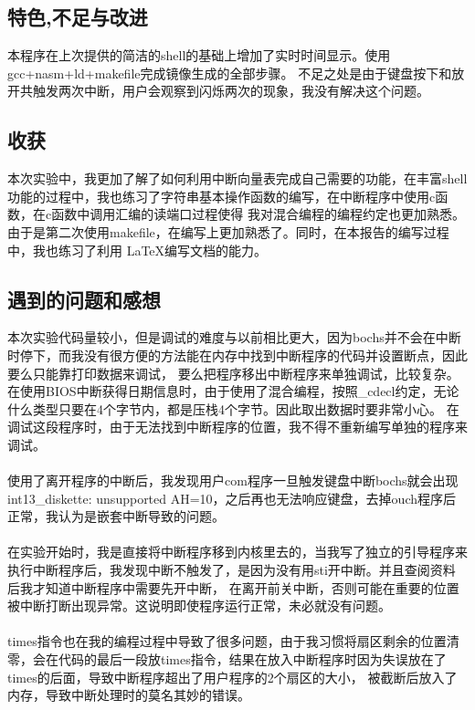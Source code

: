\documentclass[a4paper, 11pt]{article} %
\begin{document}


\subsection{特色,不足与改进}

本程序在上次提供的简洁的shell的基础上增加了实时时间显示。使用gcc+nasm+ld+makefile完成镜像生成的全部步骤。
不足之处是由于键盘按下和放开共触发两次中断，用户会观察到闪烁两次的现象，我没有解决这个问题。

\subsection{收获}

本次实验中，我更加了解了如何利用中断向量表完成自己需要的功能，在丰富shell功能的过程中，我也练习了字符串基本操作函数的编写，在中断程序中使用c函数，在c函数中调用汇编的读端口过程使得
我对混合编程的编程约定也更加熟悉。由于是第二次使用makefile，在编写上更加熟悉了\cite{makefile}。同时，在本报告的编写过程中，我也练习了利用 \LaTeX 编写文档的能力。\cite{lamport94, cite}

\subsection{遇到的问题和感想}
本次实验代码量较小，但是调试的难度与以前相比更大，因为bochs并不会在中断时停下，而我没有很方便的方法能在内存中找到中断程序的代码并设置断点，因此要么只能靠打印数据来调试，
要么把程序移出中断程序来单独调试，比较复杂。在使用BIOS中断获得日期信息时，由于使用了混合编程，按照\_cdecl约定，无论什么类型只要在4个字节内，都是压栈4个字节。因此取出数据时要非常小心。
在调试这段程序时，由于无法找到中断程序的位置，我不得不重新编写单独的程序来调试。
\paragraph{}
使用了离开程序的中断后，我发现用户com程序一旦触发键盘中断bochs就会出现int13_diskette: unsupported AH=10，之后再也无法响应键盘，去掉ouch程序后正常，我认为是嵌套中断导致的问题。
\paragraph{}
在实验开始时，我是直接将中断程序移到内核里去的，当我写了独立的引导程序来执行中断程序后，我发现中断不触发了，是因为没有用sti开中断。并且查阅资料后我才知道中断程序中需要先开中断，
在离开前关中断，否则可能在重要的位置被中断打断出现异常。这说明即使程序运行正常，未必就没有问题。
\paragraph{}
times指令也在我的编程过程中导致了很多问题，由于我习惯将扇区剩余的位置清零，会在代码的最后一段放times指令，结果在放入中断程序时因为失误放在了times的后面，导致中断程序超出了用户程序的2个扇区的大小，
被截断后放入了内存，导致中断处理时的莫名其妙的错误。
\end{document}
